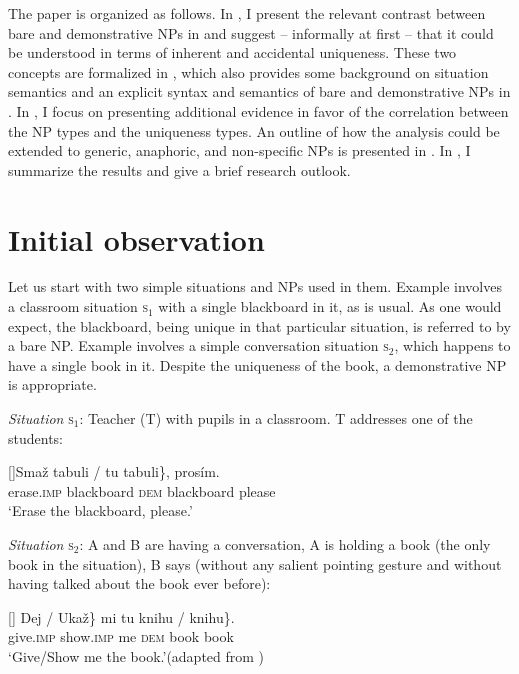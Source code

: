 \documentclass[output=paper,colorlinks,citecolor=brown,newtxmath]{langscibook}
\begin{document}
The paper is organized as follows. In , I present the relevant contrast between bare and demonstrative NPs in  and suggest -- informally at first -- that it could be understood in terms of inherent and accidental uniqueness. These two concepts are formalized in , which also provides some background on situation semantics and an explicit syntax and semantics of bare and demonstrative NPs in . In , I focus on presenting additional evidence in favor of the correlation between the NP types and the uniqueness types. An outline of how the analysis could be extended to generic, anaphoric, and non-specific NPs is presented in . In , I summarize the results and give a brief research outlook.

\largerpage[-3] %

\section{Initial observation}\label{simik:sec:observation}

Let us start with two simple situations and NPs used in them. Example  involves a classroom situation \textsc{s}$_1$ with a single blackboard in it, as is usual. As one would expect, the blackboard, being unique in that particular situation, is referred to by a bare NP. Example  involves a simple conversation situation \textsc{s}$_2$, which happens to have a single book in it. Despite the uniqueness of the book, a demonstrative NP is appropriate.

\eanoraggedright \textit{Situation} \textsc{s}$_1$: Teacher (T) with pupils in a classroom. T addresses one of the students:\label{simik:ex:blackboard}
\begin{xlist}
[]{\gll Smaž \minsp{\{} tabuli / \minsp{\#} tu tabuli\}, prosím.\\
erase.\textsc{imp} {} blackboard {} {} \textsc{dem} blackboard please\\
\glt `Erase the blackboard, please.'}
\end{xlist}
\z

\eanoraggedright \textit{Situation} \textsc{s}$_2$: A and B are having a conversation, A is holding a book (the only book in the situation), B says (without any salient pointing gesture and without having talked about the book ever before):\label{simik:ex:kramsky}
\begin{xlist}
[]{\gll \minsp{\{} Dej / Ukaž\} mi \minsp{\{} tu knihu / \minsp{\#} knihu\}.\\
{} give.\textsc{imp} {} show.\textsc{imp} me {} \textsc{dem} book {} {} book\\
\glt `Give/Show me the book.'\hfill (adapted from \citealt[62]{Kramsky1972})}
\end{xlist}
\z
\end{document}
